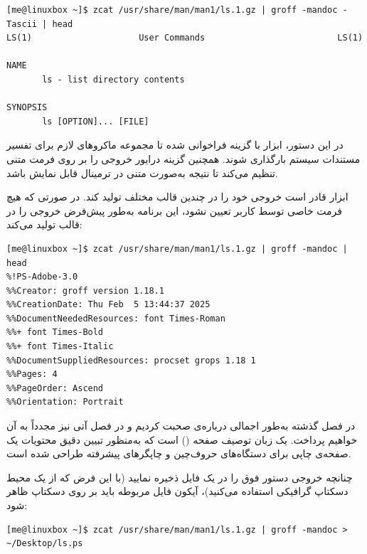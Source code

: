 \begin{latin}
\begin{lstlisting}
[me@linuxbox ~]$ zcat /usr/share/man/man1/ls.1.gz | groff -mandoc -Tascii | head
LS(1)                     User Commands                          LS(1)

NAME
       ls - list directory contents

SYNOPSIS
       ls [OPTION]... [FILE]
\end{lstlisting}
\end{latin}

در این دستور، ابزار  با گزینه  فراخوانی شده تا مجموعه‌ ماکروهای لازم برای تفسیر مستندات سیستم بارگذاری شوند. همچنین گزینه  درایور خروجی را بر روی فرمت متنی  تنظیم می‌کند تا نتیجه به‌صورت متنی در ترمینال قابل نمایش باشد.

ابزار  قادر است خروجی خود را در چندین قالب مختلف تولید کند. در صورتی که هیچ فرمت خاصی توسط کاربر تعیین نشود، این برنامه به‌طور پیش‌فرض خروجی را در قالب  تولید می‌کند:

\begin{latin}
\begin{lstlisting}
[me@linuxbox ~]$ zcat /usr/share/man/man1/ls.1.gz | groff -mandoc | head
%!PS-Adobe-3.0
%%Creator: groff version 1.18.1
%%CreationDate: Thu Feb  5 13:44:37 2025
%%DocumentNeededResources: font Times-Roman
%%+ font Times-Bold
%%+ font Times-Italic
%%DocumentSuppliedResources: procset grops 1.18 1
%%Pages: 4
%%PageOrder: Ascend
%%Orientation: Portrait
\end{lstlisting}
\end{latin}

در فصل گذشته به‌طور اجمالی درباره‌ی  صحبت کردیم و در فصل آتی نیز مجدداً به آن خواهیم پرداخت.  یک زبان توصیف صفحه () است که به‌منظور تبیین دقیق محتویات یک صفحه‌ی چاپی برای دستگاه‌های حروف‌چین و چاپگرهای پیشرفته طراحی شده است.

چنانچه خروجی دستور فوق را در یک فایل ذخیره نمایید (با این فرض که از یک محیط دسکتاپ گرافیکی استفاده می‌کنید)، آیکون فایل مربوطه باید بر روی دسکتاپ ظاهر شود:

\begin{latin}
\begin{lstlisting}
[me@linuxbox ~]$ zcat /usr/share/man/man1/ls.1.gz | groff -mandoc > ~/Desktop/ls.ps
\end{lstlisting}
\end{latin}

